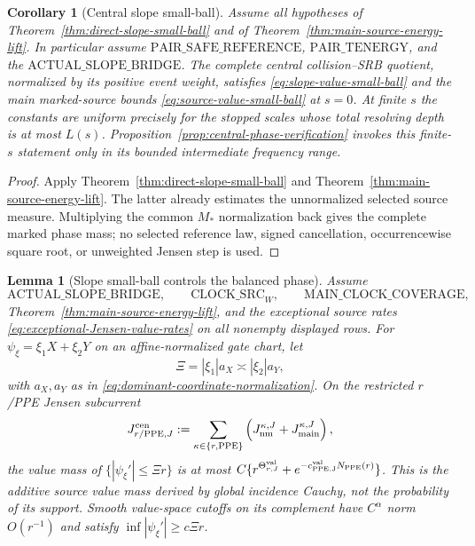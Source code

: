 \documentclass[11pt]{article}
\newtheorem{lemma}[theorem]{Lemma}
\newtheorem{corollary}[theorem]{Corollary}
\begin{document}
\begin{corollary}[Central slope small-ball]
\label{cor:central-g2}
Assume all hypotheses of
Theorem~\ref{thm:direct-slope-small-ball} and of
Theorem~\ref{thm:main-source-energy-lift}.  In particular assume
$\mathrm{PAIR\_SAFE\_REFERENCE}$, $\mathrm{PAIR\_TENERGY}$, and the
$\mathrm{ACTUAL\_SLOPE\_BRIDGE}$.
The complete central collision--SRB quotient, normalized by its positive
event weight, satisfies
\eqref{eq:slope-value-small-ball} and the main marked-source bounds
\eqref{eq:source-value-small-ball} at $s=0$.  At finite $s$ the constants are
uniform precisely for the stopped scales whose total resolving depth is at
most $L(s)$.  Proposition~\ref{prop:central-phase-verification} invokes this
finite-$s$ statement only in its bounded intermediate frequency range.
\end{corollary}

\begin{proof}
Apply Theorem~\ref{thm:direct-slope-small-ball} and
Theorem~\ref{thm:main-source-energy-lift}.  The latter already estimates the
unnormalized selected source measure.  Multiplying the common $M_*$
normalization back gives the complete marked phase mass; no selected
reference law, signed cancellation, occurrencewise square root, or
unweighted Jensen step is used.
\end{proof}

\begin{lemma}[Slope small-ball controls the balanced phase]
\label{lem:slope-good-bad-phase}
Assume
\[
 \mathrm{ACTUAL\_SLOPE\_BRIDGE},\qquad
 \mathrm{CLOCK\_SRC}_{W},\qquad
 \mathrm{MAIN\_CLOCK\_COVERAGE},
\]
Theorem~\ref{thm:main-source-energy-lift}, and the exceptional source rates
\eqref{eq:exceptional-Jensen-value-rates} on all nonempty displayed rows.
For $\psi_\xi=\xi_1X+\xi_2Y$ on an affine-normalized gate chart, let
\begin{equation}
\label{eq:balanced-physical-frequency}
 \Xi=|\xi_1|a_X\asymp|\xi_2|a_Y,
\end{equation}
with $a_X,a_Y$ as in \eqref{eq:dominant-coordinate-normalization}.  On the
restricted $r$/PPE Jensen subcurrent
\[
 J_{r/{\rm PPE},J}^{\rm cen}:=
 \sum_{\kappa\in\{r,{\rm PPE}\}}
 \left(J_{\rm nm}^{\kappa,J}+J_{\rm main}^{\kappa,J}\right),
\]
the value mass of
$\{|\psi_\xi'|\le\Xi r\}$ is at most
$C\{r^{\Theta_{r,J}^{\rm val}}
+e^{-c_{\rm PPE,J}^{\rm val}N_{\rm PPE}(r)}\}$.  This is the additive
source value mass derived by global incidence Cauchy, not the probability of
its support.  Smooth value-space cutoffs on its complement have
$C^\alpha$ norm $O(r^{-1})$ and satisfy
$\inf|\psi_\xi'|\ge c\Xi r$.
\end{lemma}
\end{document}
